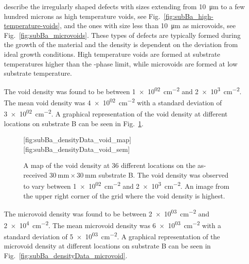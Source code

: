 \citet{selvig2007defects} describe the irregularly shaped defects with sizes extending from \SI{10}{\micro\metre} to a few hundred microns as high temperature voids, see Fig.~\ref{fig:subBa_high-temperature-voids}, and the ones with size less than \SI{10}{\micro\metre} as microvoids, see Fig.~\ref{fig:subBa_microvoids}. These types of defects are typically formed during the growth of the material and the density is dependent on the deviation from ideal growth conditions. High temperature voids are formed at substrate temperatures higher than the -phase limit, while microvoids are formed at low substrate temperature.

The void density was found to be between \SI{1e+02}{\centi\metre^{-2}} and \SI{2e+3}{\centi\metre^{-2}}. The mean void density was \SI{4e+02}{\centi\metre^{-2}} with a standard deviation of \SI{3e+02}{\centi\metre^{-2}}. A graphical representation of the void density at different locations on substrate B can be seen in Fig.~\ref{fig:subBa_densityData_void}.

\begin{figure}[htbp]
    \centering
        [fig:subBa_densityData_void_map]
        \hfill
        [fig:subBa_densityData_void_sem]
    \caption[Map of the void density on the as-received substrate B.]{ A map of the void density at 36 different locations on the as-received $\SI{30}{\milli\metre}\times\SI{30}{\milli\metre}$ substrate B. The void density was observed to vary between \SI{1e+02}{\centi\metre^{-2}} and \SI{2e+3}{\centi\metre^{-2}}.  An image from the upper right corner of the grid where the void density is highest.}
    \label{fig:subBa_densityData_void}
\end{figure}

The microvoid density was found to be between \SI{2e+03}{\centi\metre^{-2}} and \SI{2e+4}{\centi\metre^{-2}}. The mean microvoid density was \SI{6e+03}{\centi\metre^{-2}} with a standard deviation of \SI{5e+03}{\centi\metre^{-2}}. A graphical representation of the microvoid density at different locations on substrate B can be seen in Fig.~\ref{fig:subBa_densityData_microvoid}.


